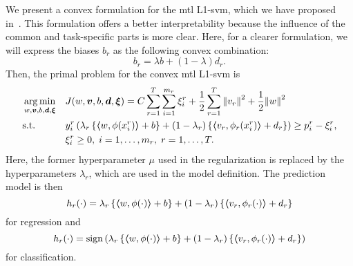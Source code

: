 We present a convex formulation for the \acrshort{mtl} L1-\acrshort{svm}, which we have proposed in~\cite{RuizAD19}. This formulation offers a better interpretability because the influence of the common and task-specific parts is more clear. 
%
Here, for a clearer formulation, we will express the biases $b_r$ as the following convex combination:
$$ b_r = \lambda b + (1 - \lambda) d_r .$$  
%
Then, the primal problem for the convex \acrshort{mtl} L1-\acrshort{svm} is
\begin{equation}\label{eq:svmmtl_primal_convex}
    \begin{aligned}
    & \argmin_{w, \fv{v}, b, \fv{d}, \fv{\xi}}
    & & {J({w}, \fv{v}, b, \fv{d}, \fv{\xi}) = C \sum_{r= 1}^T \sum_{i=1}^{m_r} {\xi_{i}^r} + \frac{1}{2} \sum_{r= 1}^T{\norm{{v}_r}^2} + \frac{1}{2} {\norm{{w}}}^2} \\
    & \text{s.t.}
    & & y_{i}^r \left(\lambda_r \left\lbrace \dotp{w}{\phi(x_{i}^r)} + b  \right\rbrace + (1 - \lambda_r) \left\lbrace \dotp{{v}_r}{\phi_r(x_{i}^r)} + d_r \right\rbrace  \right) \geq p_{i}^r - \xi_{i}^r ,  \\
    & & & \xi_{i}^r \geq 0, \;  i=1 , \dotsc , m_r, \;  r= 1,\dotsc, T  . \\
    \end{aligned}
\end{equation}
Here, the former hyperparameter $\mu$ used in the regularization is replaced by the hyperparameters $\lambda_r$, which are used in the model definition. The prediction model is then
\begin{equation}
    \nonumber
    h_r({\cdot}) = \lambda_r \left\lbrace \bm{\left\langle} w, \phi(\cdot) \bm{\right\rangle} + b  \right\rbrace + (1 - \lambda_r) \left\lbrace \bm{\left\langle} {v}_r, \phi_r(\cdot) \bm{\right\rangle} + d_r \right\rbrace
\end{equation}
for regression and 
\begin{equation}
    \nonumber
    h_r({\cdot}) = \operatorname{sign}{ \left(\lambda_r \left\lbrace \bm{\left\langle} w, \phi(\cdot) \bm{\right\rangle} + b  \right\rbrace + (1 - \lambda_r) \left\lbrace \bm{\left\langle} {v}_r, \phi_r(\cdot) \bm{\right\rangle} + d_r \right\rbrace \right)}
\end{equation}
for classification.
%

